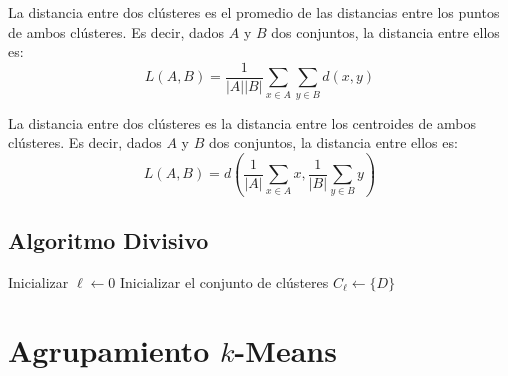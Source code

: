 \documentclass[a4,11pt]{aleph-notas}
\begin{document}
\begin{defi}
    La distancia entre dos clústeres es el promedio de las distancias entre los puntos de ambos clústeres. Es decir, dados $A$ y $B$ dos conjuntos, la distancia entre ellos es:
    \[
        L(A,B) = \frac{1}{|A||B|} \sum_{x \in A} \sum_{y \in B} d(x,y)
    \]  
\end{defi}

\begin{defi}
    La distancia entre dos clústeres es la distancia entre los centroides de ambos clústeres. Es decir, dados $A$ y $B$ dos conjuntos, la distancia entre ellos es:
    \[
        L(A,B) = d\left( \frac{1}{|A|} \sum_{x \in A} x, \frac{1}{|B|} \sum_{y \in B} y \right)
    \]
\end{defi}

\subsection{Algoritmo Divisivo}

\begin{algorithm}[H]
   
    \caption{Pseudocódigo del agrupamiento jerárquico divisivo (DHC)}
    
    
    Inicializar $\ell \leftarrow 0$\;
    Inicializar el conjunto de clústeres $C_\ell \leftarrow \{D\}$\;
    
    
\end{algorithm}

\newpage
\section{Agrupamiento $k$-Means}
\end{document}
